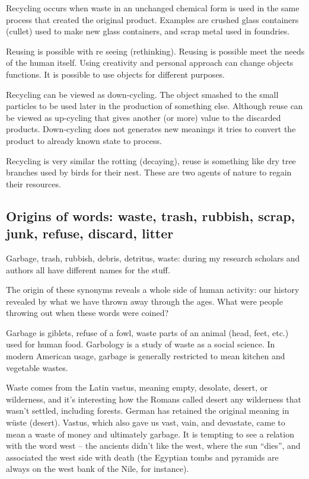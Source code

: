\documentclass[12pt]{article}
\begin{document}
Recycling occurs when waste in an unchanged chemical form is used in the same process that created the original product. Examples are crushed glass containers (cullet) used to make new glass containers, and scrap metal used in foundries. 

Reusing is possible with re seeing (rethinking). Reusing is possible meet the needs of the human itself. Using creativity and personal approach can change objects functions. It is possible to use objects for different purposes. 

Recycling can be viewed as down-cycling. The object smashed to the small particles to be used later in the production of something else. Although reuse can be viewed as up-cycling that gives another (or more) value to the discarded products. Down-cycling does not generates new meanings it tries to convert the product to already known state to process. 

Recycling is very similar the rotting (decaying), reuse is something like dry tree branches used by birds for their nest. These are two agents of nature to regain their resources.

\subsection{Origins of words: waste, trash, rubbish, scrap, junk, refuse, discard, litter}
Garbage, trash, rubbish, debris, detritus, waste: during my research scholars and authors all have different names for the stuff.

The origin of these synonyms reveals a whole side of human activity: our history revealed by what we have thrown away through the ages. What were people throwing out when these words were coined? 

Garbage is giblets, refuse of a fowl, waste parts of an animal (head, feet, etc.) used for human food. Garbology is a study of waste as a social science. In modern American usage, garbage is generally restricted to mean kitchen and vegetable wastes.

Waste comes from the Latin vastus, meaning empty, desolate, desert, or wilderness, and it’s interesting how the Romans called desert any wilderness that wasn’t settled, including forests.  German has retained the original meaning in wüste (desert). Vastus, which also gave us vast, vain, and devastate, came to mean a waste of money and ultimately garbage.  It is tempting to see a relation with the word west – the ancients didn’t like the west, where the sun “dies”, and associated the west side with death (the Egyptian tombs and pyramids are always on the west bank of the Nile, for instance)\cite{paul2013garbage}.
\end{document}
